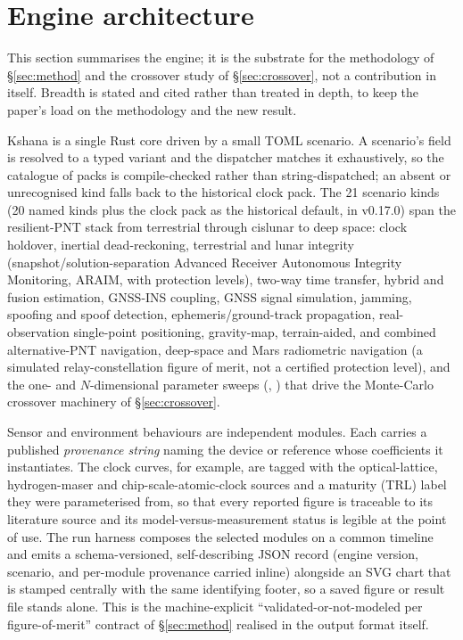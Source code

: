 \section{Engine architecture}\label{sec:arch}

This section summarises the engine; it is the substrate for the methodology of
\S\ref{sec:method} and the crossover study of \S\ref{sec:crossover}, not a
contribution in itself. Breadth is stated and cited rather than treated in depth, to
keep the paper's load on the methodology and the new result.

Kshana \citep{baweja2026kshana} is a single Rust core driven by a small TOML scenario.
A scenario's  field is resolved to a typed variant and the dispatcher
matches it exhaustively, so the catalogue of packs is compile-checked rather than
string-dispatched; an absent or unrecognised kind falls back to the historical clock
pack. The 21 scenario kinds (20 named kinds plus the clock pack as the
historical default, in v0.17.0) span the resilient-PNT stack from terrestrial through
cislunar to deep space: clock holdover,
inertial dead-reckoning, terrestrial and lunar integrity (snapshot/solution-separation
Advanced Receiver Autonomous Integrity Monitoring, ARAIM, with protection levels),
two-way time transfer, hybrid and fusion estimation,
GNSS-INS coupling, GNSS signal simulation, jamming, spoofing and spoof detection,
ephemeris/ground-track propagation, real-observation single-point positioning,
gravity-map, terrain-aided, and combined alternative-PNT navigation,
deep-space and Mars radiometric navigation (a simulated relay-constellation figure of
merit, not a certified protection level), and the one- and $N$-dimensional parameter
sweeps (,
) that drive the Monte-Carlo crossover machinery of \S\ref{sec:crossover}.

Sensor and environment behaviours are independent modules. Each carries a published
\emph{provenance string} naming the device or reference whose coefficients it
instantiates. The clock curves, for example, are tagged with the optical-lattice,
hydrogen-maser and chip-scale-atomic-clock sources and a maturity (TRL) label they were
parameterised from, so that every reported figure is traceable to its literature
source and its model-versus-measurement status is legible at the point of use. The run
harness composes the selected modules on a common timeline and emits a
schema-versioned, self-describing JSON record (engine version, scenario, and per-module
provenance carried inline) alongside an SVG chart that is stamped centrally with the
same identifying footer, so a saved figure or result file stands alone. This is the
machine-explicit ``validated-or-not-modeled per figure-of-merit'' contract of
\S\ref{sec:method} realised in the output format itself.

